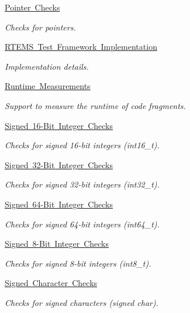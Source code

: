 \begin{DoxyCompactItemize}
\mbox{\hyperlink{group__RTEMSTestFrameworkChecksPointer}{Pointer Checks}}
\begin{DoxyCompactList}\small\item\em Checks for pointers. \end{DoxyCompactList}\item 
\mbox{\hyperlink{group__RTEMSTestFrameworkImpl}{R\+T\+E\+M\+S Test Framework Implementation}}
\begin{DoxyCompactList}\small\item\em Implementation details. \end{DoxyCompactList}\item 
\mbox{\hyperlink{group__RTEMSTestFrameworkMeasureRuntime}{Runtime Measurements}}
\begin{DoxyCompactList}\small\item\em Support to measure the runtime of code fragments. \end{DoxyCompactList}\item 
\mbox{\hyperlink{group__RTEMSTestFrameworkChecksInt16}{Signed 16-\/\+Bit Integer Checks}}
\begin{DoxyCompactList}\small\item\em Checks for signed 16-\/bit integers (int16\+\_\+t). \end{DoxyCompactList}\item 
\mbox{\hyperlink{group__RTEMSTestFrameworkChecksInt32}{Signed 32-\/\+Bit Integer Checks}}
\begin{DoxyCompactList}\small\item\em Checks for signed 32-\/bit integers (int32\+\_\+t). \end{DoxyCompactList}\item 
\mbox{\hyperlink{group__RTEMSTestFrameworkChecksInt64}{Signed 64-\/\+Bit Integer Checks}}
\begin{DoxyCompactList}\small\item\em Checks for signed 64-\/bit integers (int64\+\_\+t). \end{DoxyCompactList}\item 
\mbox{\hyperlink{group__RTEMSTestFrameworkChecksInt8}{Signed 8-\/\+Bit Integer Checks}}
\begin{DoxyCompactList}\small\item\em Checks for signed 8-\/bit integers (int8\+\_\+t). \end{DoxyCompactList}\item 
\mbox{\hyperlink{group__RTEMSTestFrameworkChecksSChar}{Signed Character Checks}}
\begin{DoxyCompactList}\small\item\em Checks for signed characters (signed char). \end{DoxyCompactList}\item 

\end{DoxyCompactItemize}

